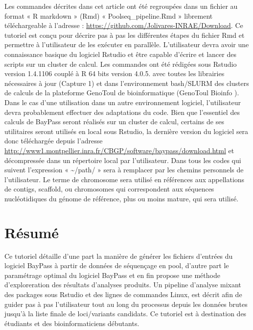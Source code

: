 \documentclass[
  openany]{book}
\theoremstyle{definition}
\theoremstyle{definition}
\theoremstyle{definition}
\theoremstyle{definition}
\theoremstyle{remark}
\begin{document}
Les commandes décrites dans cet article ont été regroupées dans un fichier au format « R markdown » (Rmd) « Poolseq\_pipeline.Rmd » librement téléchargeable à l'adresse : \url{https://github.com/Jolivares-INRAE/Download}. Ce tutoriel est conçu pour décrire pas à pas les différentes étapes du fichier Rmd et permettre à l'utilisateur de les exécuter en parallèle.
L'utilisateur devra avoir une connaissance basique du logiciel Rstudio et être capable d'écrire et lancer des scripts sur un cluster de calcul.
Les commandes ont été rédigées sous Rstudio version 1.4.1106 couplé à R 64 bits version 4.0.5. avec toutes les librairies nécessaires à jour (Capture 1) et dans l'environnement bash/SLURM des clusters de calculs de la plateforme GenoToul de bioinformatique (GenoToul Bioinfo ). Dans le cas d'une utilisation dans un autre environnement logiciel, l'utilisateur devra probablement effectuer des adaptations du code.
Bien que l'essentiel des calculs de BayPass seront réalisés sur un cluster de calcul, certains de ses utilitaires seront utilisés en local sous Rstudio, la dernière version du logiciel sera donc téléchargée depuis l'adresse \url{http://www1.montpellier.inra.fr/CBGP/software/baypass/download.html} et décompressée dans un répertoire local par l'utilisateur.
Dans tous les codes qui suivent l'expression « \textasciitilde/path/ » sera à remplacer par les chemins personnels de l'utilisateur.
Le terme de chromosome sera utilisé en références aux appellations de contigs, scaffold, ou chromosomes qui correspondent aux séquences nucléotidiques du génome de référence, plus ou moins mature, qui sera utilisé.

\hypertarget{ruxe9sumuxe9-1}{%
\chapter*{Résumé}\label{ruxe9sumuxe9-1}}

Ce tutoriel détaille d'une part la manière de générer les fichiers d'entrées du logiciel BayPass à partir de données de séquençage en pool, d'autre part le paramétrage optimal du logiciel BayPass et en fin propose une méthode d'exploreration des résultats d'analyses produits. Un pipeline d'analyse mixant des packages sous Rstudio et des lignes de commandes Linux, est décrit afin de guider pas à pas l'utilisateur tout au long du processus depuis les données brutes jusqu'à la liste finale de loci/variants candidats.
Ce tutoriel est à destination des étudiants et des bioinformaticiens débutants.
\end{document}
